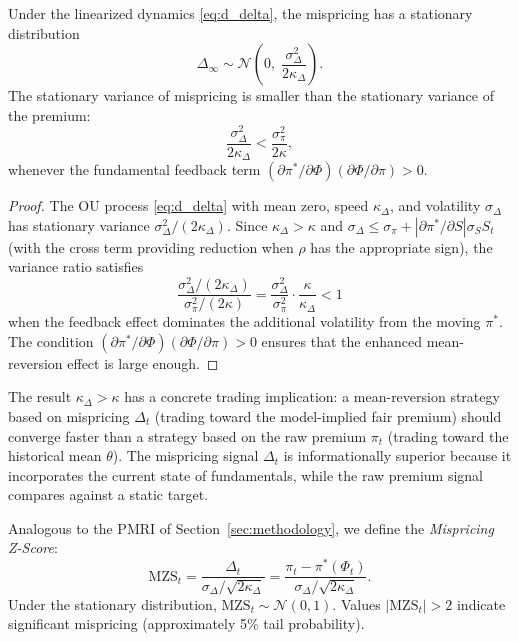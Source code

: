 \begin{proposition}%
\label{prop:mispricing_stat}
Under the linearized dynamics \eqref{eq:d_delta}, the mispricing has a
stationary distribution
\begin{equation}\label{eq:delta_stationary}
  \Delta_\infty \sim \mathcal{N}\!\left(0,\;
  \frac{\sigma_\Delta^2}{2\kappa_\Delta}\right).
\end{equation}
The stationary variance of mispricing is smaller than the stationary
variance of the premium:
\begin{equation}\label{eq:var_comparison}
  \frac{\sigma_\Delta^2}{2\kappa_\Delta}
  < \frac{\sigma_\pi^2}{2\kappa},
\end{equation}
whenever the fundamental feedback term
$(\partial\pi^*/\partial\Phi)(\partial\Phi/\partial\pi) > 0$.
\end{proposition}

\begin{proof}
The OU process \eqref{eq:d_delta} with mean zero, speed $\kappa_\Delta$,
and volatility $\sigma_\Delta$ has stationary variance
$\sigma_\Delta^2/(2\kappa_\Delta)$.  Since $\kappa_\Delta > \kappa$ and
$\sigma_\Delta \le \sigma_\pi + |\partial\pi^*/\partial S|\sigma_S S_t$
(with the cross term providing reduction when $\rho$ has the appropriate
sign), the variance ratio satisfies
\[
  \frac{\sigma_\Delta^2 / (2\kappa_\Delta)}{\sigma_\pi^2 / (2\kappa)}
  = \frac{\sigma_\Delta^2}{\sigma_\pi^2} \cdot
  \frac{\kappa}{\kappa_\Delta}
  < 1
\]
when the feedback effect dominates the additional volatility from the
moving $\pi^*$.  The condition
$(\partial\pi^*/\partial\Phi)(\partial\Phi/\partial\pi) > 0$ ensures that
the enhanced mean-reversion effect is large enough.
\end{proof}

\begin{remark}\label{rem:trading}
The result $\kappa_\Delta > \kappa$ has a concrete trading implication:
a mean-reversion strategy based on mispricing $\Delta_t$ (trading toward
the model-implied fair premium) should converge faster than a strategy
based on the raw premium $\pi_t$ (trading toward the historical mean
$\theta$).  The mispricing signal $\Delta_t$ is informationally superior
because it incorporates the current state of fundamentals, while the raw
premium signal compares against a static target.
\end{remark}

\begin{definition}\label{def:mispricing_zscore}
Analogous to the PMRI of Section~\ref{sec:methodology}, we define the
\emph{Mispricing Z-Score}:
\begin{equation}\label{eq:mzs}
  \mathrm{MZS}_t = \frac{\Delta_t}{\sigma_\Delta / \sqrt{2\kappa_\Delta}}
  = \frac{\pi_t - \pi^*(\Phi_t)}{\sigma_\Delta / \sqrt{2\kappa_\Delta}}.
\end{equation}
Under the stationary distribution, $\mathrm{MZS}_t \sim \mathcal{N}(0,1)$.
Values $|\mathrm{MZS}_t| > 2$ indicate significant mispricing
(approximately 5\% tail probability).
\end{definition}

